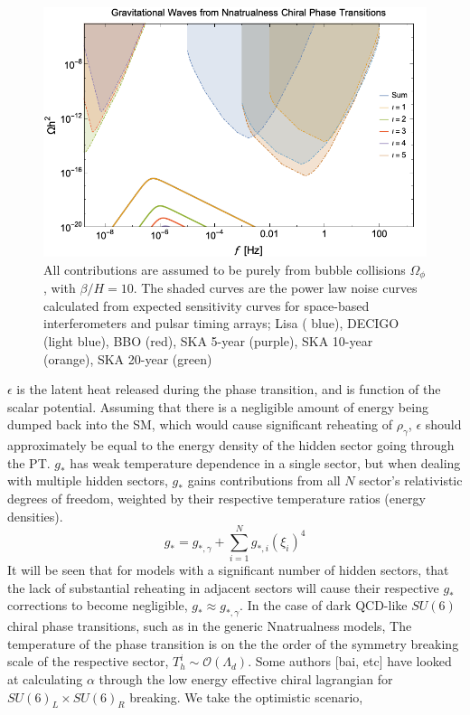 \documentclass[nofootinbib,twocolumn,preprintnumbers]{revtex4-1}
\begin{document}
\begin{figure}[tb]
\centering
\includegraphics[scale=.3]{Nnatral.png} 
\caption{ All contributions are assumed to be purely from bubble collisions $\Omega_{\phi}$, with $\beta/H  = 10$.  The shaded curves are the power law noise curves calculated from expected sensitivity curves for space-based interferometers and pulsar timing arrays; Lisa ( blue), DECIGO (light blue), BBO (red), SKA 5-year (purple), SKA 10-year (orange), SKA 20-year (green)   }
\end{figure}

 $\epsilon$ is the latent heat released during the phase transition, and is function of the scalar potential. Assuming that there is a negligible amount of energy being dumped back into the SM, which would cause significant reheating of $\rho_{\gamma}$,  $\epsilon$ should approximately be equal to the energy density of the hidden sector going through the PT. $g_{*}$ has weak temperature dependence in a single sector, but when dealing with multiple hidden sectors, $g_{*}$ gains contributions from all $N$ sector's relativistic degrees of freedom, weighted by their respective temperature ratios (energy densities).
\begin{equation}
g_{*} = g_{*,\gamma} + \sum_{i = 1}^{N} g_{*,i} (\xi_{i})^4
\end{equation}
It will be seen that for models with a significant number of hidden sectors, that the lack of substantial reheating in adjacent sectors will cause their respective $g_{*}$ corrections to become negligible, $g_{*} \approx g_{*,\gamma}$. In the case of dark QCD-like $SU(6)$ chiral  phase transitions, such as in the generic Nnatrualness models, The temperature of the phase transition is on the the order of the symmetry breaking scale of the respective sector, $T_{h}^{i} \sim \mathcal{O}(\Lambda_{d})$. Some authors [bai, etc] have looked at calculating $\alpha$ through the low energy effective chiral lagrangian for $SU(6)_{L} \times SU(6)_{R}$ breaking. We take the optimistic scenario, 
\end{document}
